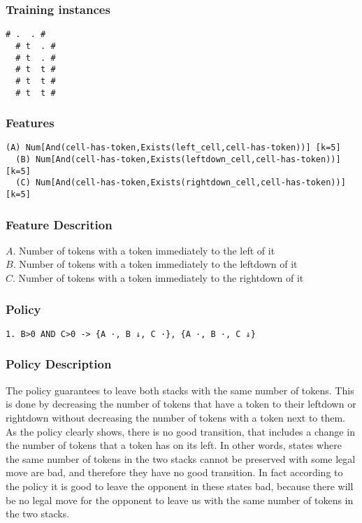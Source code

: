 \documentclass[a4paper]{article}
\begin{document}
\subsubsection{Training instances}
\begin{Verbatim}[fontsize=\footnotesize]
  # .  . #
  # t  . #
  # t  . #
  # t  t #
  # t  t #
  # t  t #
\end{Verbatim}

\subsubsection{Features}
\begin{Verbatim}[fontsize=\footnotesize]
  (A) Num[And(cell-has-token,Exists(left_cell,cell-has-token))] [k=5]
  (B) Num[And(cell-has-token,Exists(leftdown_cell,cell-has-token))] [k=5]
  (C) Num[And(cell-has-token,Exists(rightdown_cell,cell-has-token))] [k=5]
\end{Verbatim}

\subsubsection{Feature Descrition}
$A$. Number of tokens with a token immediately to the left of it\\
$B$. Number of tokens with a token immediately to the leftdown of it\\
$C$. Number of tokens with a token immediately to the rightdown of it

\subsubsection{Policy}
\begin{Verbatim}[fontsize=\footnotesize]
  1. B>0 AND C>0 -> {A ·, B ↓, C ·}, {A ·, B ·, C ↓}
\end{Verbatim}

\subsubsection{Policy Description}
The policy guarantees to leave both stacks with the same number of tokens. This is done by decreasing the number of tokens that have a token to their leftdown or rightdown without decreasing the number of tokens with a token next to them.
As the policy clearly shows, there is no good transition, that includes a change in the number of tokens that a token has on its left. In other words, states where the same number of tokens in the two stacks cannot be preserved with some legal move are bad, and therefore they have no good transition. In fact according to the policy it is good to leave the opponent in these states bad, because there will be no legal move for the opponent to leave us with the same number of tokens in the two stacks.
\end{document}
